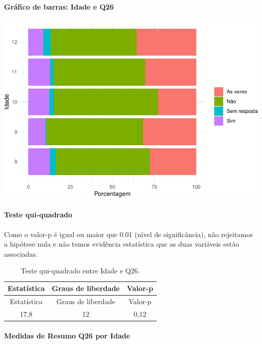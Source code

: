 \documentclass[]{article}
\let\oldparagraph\paragraph
\renewcommand{\paragraph}[1]{\oldparagraph{#1}\mbox{}}
\begin{document}
\hypertarget{gruxe1fico-de-barras-idade-e-q26}{%
\paragraph{Gráfico de barras: Idade e Q26}\label{gruxe1fico-de-barras-idade-e-q26}}

\begin{center}\includegraphics[width=0.75\linewidth]{relatorio_covid19_files/figure-latex/unnamed-chunk-742-1} \end{center}

\hypertarget{teste-qui-quadrado-64}{%
\paragraph{Teste qui-quadrado}\label{teste-qui-quadrado-64}}

Como o valor-p é igual ou maior que 0.01 (nível de significância), não rejeitamos a hipótese nula e não temos evidência estatística que as duas variáveis estão associadas.

\begin{longtable}[]{@{}ccc@{}}
\caption{\label{tab:unnamed-chunk-744}Teste qui-quadrado entre Idade e Q26.}\tabularnewline
\toprule
Estatística & Graus de liberdade & Valor-p\tabularnewline
\midrule
\endfirsthead
\toprule
Estatística & Graus de liberdade & Valor-p\tabularnewline
\midrule
\endhead
17,8 & 12 & 0,12\tabularnewline
\bottomrule
\end{longtable}

\cleardoublepage

\hypertarget{medidas-de-resumo-q26-por-idade}{%
\paragraph{Medidas de Resumo Q26 por Idade}\label{medidas-de-resumo-q26-por-idade}}
\end{document}
